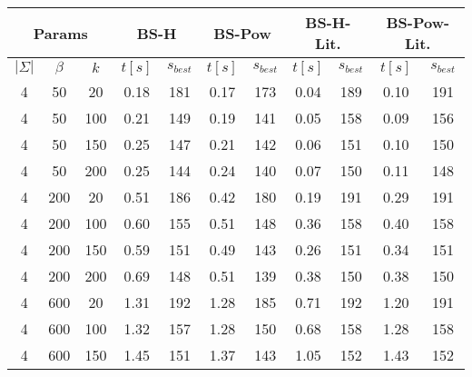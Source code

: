 \documentclass{article}
\begin{document}
    \begin{center}
        \begin{tabular}{| c c c | c c | c c | c c | c c |}
            \hline
            \multicolumn{3}{|c}{Params} & \multicolumn{2}{|c|}{BS-H} & \multicolumn{2}{|c|}{BS-Pow} & \multicolumn{2}{c|}{BS-H-Lit.} & \multicolumn{2}{c|}{BS-Pow-Lit.}\\
            \hline
            $|\Sigma|$ & $\beta$ & $k$ & $t[s]$ & $s_{best}$ & $t[s]$ & $s_{best}$ & $t[s]$ & $s_{best}$ & $t[s]$ & $s_{best}$ \\
            \hline
            4          & 50      & 20  & 0.18   & 181        & 0.17   & 173        & 0.04   & 189        & 0.10   & 191        \\
            \hline
            4          & 50      & 100 & 0.21   & 149        & 0.19   & 141        & 0.05   & 158        & 0.09   & 156        \\
            \hline
            4          & 50      & 150 & 0.25   & 147        & 0.21   & 142        & 0.06   & 151        & 0.10   & 150        \\
            \hline
            4          & 50      & 200 & 0.25   & 144        & 0.24   & 140        & 0.07   & 150        & 0.11   & 148        \\
            \hline
            4          & 200     & 20  & 0.51   & 186        & 0.42   & 180        & 0.19   & 191        & 0.29   & 191        \\
            \hline
            4          & 200     & 100 & 0.60   & 155        & 0.51   & 148        & 0.36   & 158        & 0.40   & 158        \\
            \hline
            4          & 200     & 150 & 0.59   & 151        & 0.49   & 143        & 0.26   & 151        & 0.34   & 151        \\
            \hline
            4          & 200     & 200 & 0.69   & 148        & 0.51   & 139        & 0.38   & 150        & 0.38   & 150        \\
            \hline
            4          & 600     & 20  & 1.31   & 192        & 1.28   & 185        & 0.71   & 192        & 1.20   & 191        \\
            \hline
            4          & 600     & 100 & 1.32   & 157        & 1.28   & 150        & 0.68   & 158        & 1.28   & 158        \\
            \hline
            4          & 600     & 150 & 1.45   & 151        & 1.37   & 143        & 1.05   & 152        & 1.43   & 152        \\

\end{tabular}
\end{center}
\end{document}
